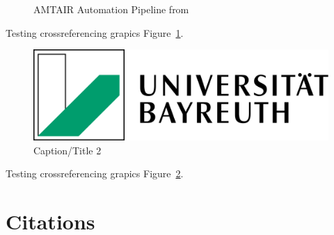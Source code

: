 \documentclass[]{book}
\begin{document}
\begin{figure}


\caption[Five-step AMTAIR automation pipeline from PDFs to Bayesian
networks]{\label{fig-automation_pipeline}AMTAIR Automation Pipeline from
\textcite{bucknall2022}}

\end{figure}%

Testing crossreferencing grapics Figure~\ref{fig-automation_pipeline}.

\begin{figure}

\includegraphics[width=0.3\linewidth,height=\textheight,keepaspectratio]{images/cover.png}

\caption[Short 2 caption]{\label{fig-testgraphic2}Caption/Title 2}

\end{figure}%

Testing crossreferencing grapics Figure~\ref{fig-testgraphic2}.

\section*{Citations}\label{sec-citations}
\end{document}
